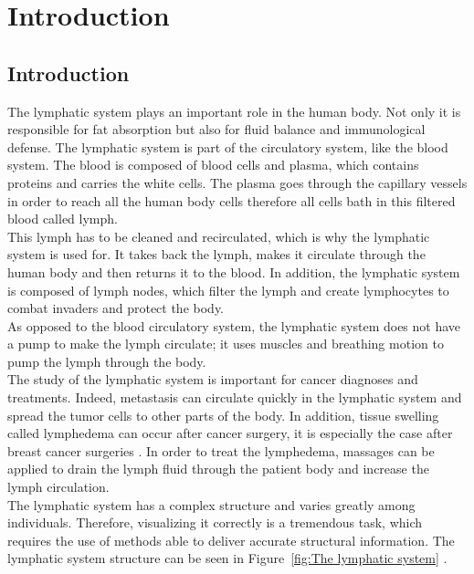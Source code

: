 
\chapter[Introduction]{Introduction}
\section{Introduction}

The lymphatic system plays an important role in the human body. Not only it is responsible for fat absorption but also for fluid balance and immunological defense. The lymphatic system is part of the circulatory system, like the blood system. The blood is composed of blood cells and plasma, which contains proteins and carries the white cells.  The plasma goes through the capillary vessels in order to reach all the human body cells therefore all cells bath in this filtered blood called lymph.  \\

This lymph has to be cleaned and recirculated, which is why the lymphatic system is used for. It takes back the lymph, makes it circulate through the human body and then returns it to the blood. In addition, the lymphatic system is composed of lymph nodes, which filter the lymph and create lymphocytes to combat invaders and protect the body. \\

As opposed to the blood circulatory system, the lymphatic system does not have a pump to make the lymph circulate; it uses muscles and breathing motion to pump the lymph through the body. \\

The study of the lymphatic system is important for cancer diagnoses and treatments. Indeed, metastasis can circulate quickly in the lymphatic system and spread the tumor cells to other parts of the body. In addition, tissue swelling called lymphedema can occur after cancer surgery, it is especially the case after breast cancer surgeries \cite{marshall_near-infrared_2010}. In order to treat the lymphedema, massages can be applied to drain the lymph fluid through the patient body and increase the lymph circulation. \\

The lymphatic system has a complex structure and varies greatly among individuals. Therefore, visualizing it correctly is a tremendous task, which requires the use of methods able to deliver accurate structural information.  The lymphatic system structure can be seen in Figure~\ref{fig:The lymphatic system} \cite{lymphatic}.

